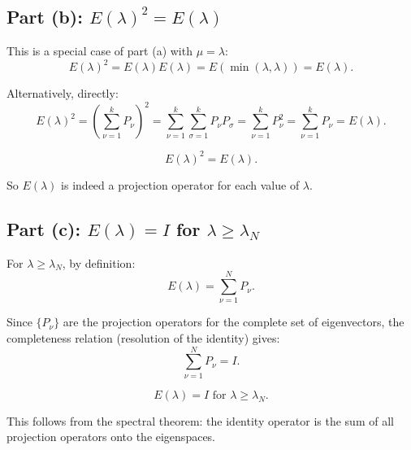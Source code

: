 \documentclass[12pt]{article}
\begin{document}
\subsection*{Part (b): $E(\lambda)^2 = E(\lambda)$}

This is a special case of part (a) with $\mu = \lambda$:
\[
E(\lambda)^2 = E(\lambda)E(\lambda) = E(\min(\lambda,\lambda)) = E(\lambda).
\]

Alternatively, directly:
\[
E(\lambda)^2 = \left(\sum_{\nu=1}^{k}P_\nu\right)^2 = \sum_{\nu=1}^{k}\sum_{\sigma=1}^{k}P_\nu P_\sigma = \sum_{\nu=1}^{k}P_\nu^2 = \sum_{\nu=1}^{k}P_\nu = E(\lambda).
\]

\[
\boxed{E(\lambda)^2 = E(\lambda).}
\]

So $E(\lambda)$ is indeed a projection operator for each value of $\lambda$.

\subsection*{Part (c): $E(\lambda) = I$ for $\lambda \geq \lambda_N$}

For $\lambda \geq \lambda_N$, by definition:
\[
E(\lambda) = \sum_{\nu=1}^{N}P_\nu.
\]

Since $\{P_\nu\}$ are the projection operators for the complete set of eigenvectors, the completeness relation (resolution of the identity) gives:
\[
\sum_{\nu=1}^{N}P_\nu = I.
\]

\[
\boxed{E(\lambda) = I \text{ for } \lambda \geq \lambda_N.}
\]

This follows from the spectral theorem: the identity operator is the sum of all projection operators onto the eigenspaces.
\end{document}
